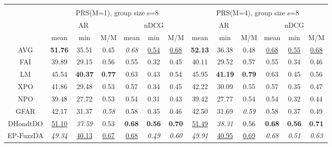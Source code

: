 \begin{tabular}{ c | c c c | c c c || c c c | c c c}
\multicolumn{12}{c}{} \\
\multicolumn{1}{c}{} & \multicolumn{6}{c}{PRS(M=1), group size s=8} & \multicolumn{6}{c}{PRS(M=4), group size s=8} \\
\multicolumn{1}{c}{} & \multicolumn{3}{c}{AR} & \multicolumn{3}{c}{nDCG} & \multicolumn{3}{c}{AR} & \multicolumn{3}{c}{nDCG} \\
& mean & min & M/M & mean & min & M/M & mean & min & M/M & mean & min & M/M \\
\hline
AVG & \textbf{51.76} & 35.51 & 0.45 & \textit{0.68} & \underline{0.54} & \underline{0.68} & \textbf{52.13} & 36.38 & 0.48 & \underline{0.68} & \underline{0.55} & \underline{0.68} \\
FAI & 39.89 & 29.15 & 0.56 & 0.55 & 0.32 & 0.45 & 40.11 & 29.52 & 0.57 & 0.55 & 0.34 & 0.46 \\
LM & 45.54 & \textbf{40.37} & \textbf{0.77} & 0.63 & 0.43 & 0.54 & 45.95 & \textbf{41.19} & \textbf{0.79} & 0.63 & 0.45 & 0.56 \\
XPO & 41.86 & 29.48 & 0.53 & 0.57 & 0.34 & 0.45 & 42.22 & 30.09 & 0.55 & 0.57 & 0.35 & 0.47 \\
NPO & 39.48 & 27.72 & 0.53 & 0.54 & 0.31 & 0.43 & 39.42 & 27.77 & 0.54 & 0.54 & 0.32 & 0.44 \\
GFAR & 42.17 & 31.37 & \textit{0.58} & 0.58 & 0.35 & 0.46 & 42.50 & 31.69 & \textit{0.59} & 0.58 & 0.37 & 0.49 \\
DHondtDO & \underline{51.10} & \textit{37.59} & 0.53 & \textbf{0.68} & \textbf{0.56} & \textbf{0.70} & \underline{51.49} & \textit{38.31} & 0.56 & \textbf{0.68} & \textbf{0.56} & \textbf{0.71} \\
EP-FuzzDA & \textit{49.34} & \underline{40.13} & \underline{0.67} & \underline{0.68} & \textit{0.49} & \textit{0.60} & \textit{49.91} & \underline{40.95} & \underline{0.69} & \textit{0.68} & \textit{0.51} & \textit{0.63} \\

\end{tabular}
